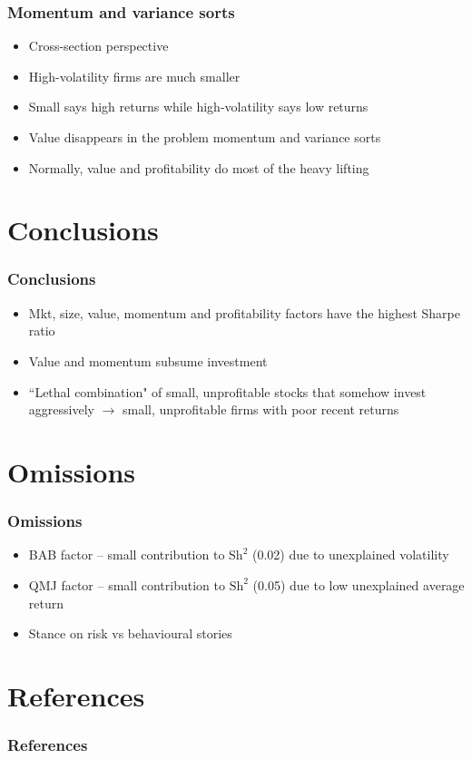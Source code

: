 \documentclass[notes]{beamer}  %
\begin{document}
\begin{frame}
\frametitle{Momentum and variance sorts}
\begin{itemize}
    \item Cross-section perspective
    \item High-volatility firms are much smaller
    \item Small says high returns while high-volatility says low returns
    \item Value disappears in the problem momentum and variance sorts
    \item Normally, value and profitability do most of the heavy lifting
\end{itemize}
\end{frame}

\section{Conclusions}

\begin{frame}
\frametitle{Conclusions}
\begin{itemize}
    \item Mkt, size, value, momentum and profitability factors have the
    highest Sharpe ratio
    \item Value and momentum subsume investment
    \item ``Lethal combination" of small, unprofitable stocks that somehow
    invest aggressively $\rightarrow$ small, unprofitable firms with poor
    recent returns
\end{itemize}
\end{frame}

\section{Omissions}

\begin{frame}
\frametitle{Omissions}
\begin{itemize}
    \item BAB factor -- small contribution to $\text{Sh}^2$ (0.02) due to
    unexplained volatility
    \item QMJ factor -- small contribution to $\text{Sh}^2$ (0.05) due to low
    unexplained average return
    \item Stance on risk vs behavioural stories
\end{itemize}
\end{frame}

\section{References}

\begin{frame}[allowframebreaks]
  \frametitle{References}
  \printbibliography
\end{frame}
\end{document}
